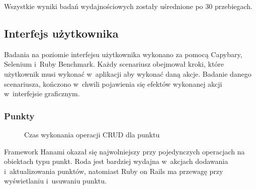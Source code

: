\documentclass[archivemode]{mgr}
\begin{document}
Wszystkie wyniki badań wydajnościowych zostały uśrednione po 30 przebiegach.

\subsection{Interfejs użytkownika}

Badania na poziomie interfejsu użytkownika wykonano za pomocą Capybary, Selenium i~Ruby Benchmark. Każdy scenariusz obejmował kroki, które użytkownik musi wykonać w~aplikacji aby wykonać daną akcje. Badanie danego scenariusza, kończono w~chwili pojawienia się efektów wykonanej akcji w~interfejsie graficznym.

\subsubsection{Punkty}

\begin{figure}[H]
  \centering
  \caption{Czas wykonania operacji CRUD dla punktu}
  \label{fig:crud_points}
\end{figure}

Framework Hanami okazał się najwolniejszy przy pojedynczych operacjach na obiektach typu punkt. Roda jest bardziej wydajna w~akcjach dodawania i~aktualizowania punktów, natomiast Ruby on Rails ma przewagę przy wyświetlaniu i~usuwaniu punktu.
\end{document}

